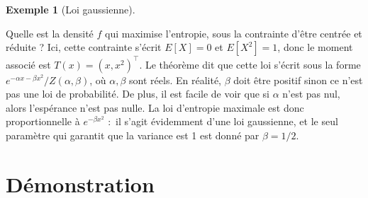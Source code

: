 \documentclass[
  10,
  letterpaper,
  DIV=11,
  numbers=noendperiod]{scrreport}
\theoremstyle{plain}
\theoremstyle{definition}
\theoremstyle{plain}
\theoremstyle{definition}
\theoremstyle{definition}
\newtheorem{example}{Exemple}[chapter]
\theoremstyle{plain}
\theoremstyle{remark}
\begin{document}
\begin{example}[Loi
gaussienne]\protect\hypertarget{exm-test}{}\label{exm-test}

Quelle est la densité \(f\) qui maximise l'entropie, sous la contrainte
d'être centrée et réduite ? Ici, cette contrainte s'écrit \(E[X] = 0\)
et \(E[X^2]=1\), donc le moment associé est \(T(x) = (x, x^2)^\top\). Le
théorème dit que cette loi s'écrit sous la forme
\(e^{-\alpha x - \beta x^2} / Z(\alpha, \beta)\), où \(\alpha,\beta\)
sont réels. En réalité, \(\beta\) doit être positif sinon ce n'est pas
une loi de probabilité. De plus, il est facile de voir que si \(\alpha\)
n'est pas nul, alors l'espérance n'est pas nulle. La loi d'entropie
maximale est donc proportionnelle à \(e^{-\beta x^2}\) :~il s'agit
évidemment d'une loi gaussienne, et le seul paramètre qui garantit que
la variance est 1 est donné par \(\beta = 1/2\).

\end{example}

\hypertarget{duxe9monstration}{%
\section{Démonstration}\label{duxe9monstration}}
\end{document}
